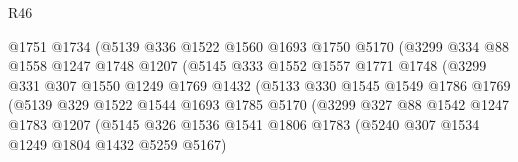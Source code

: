 \begin{lexlean}{R46}
\begin{coremodule}
                                @1751
                                @1734
                                (@5139
                                  @336
                                  @1522
                                  @1560
                                  @1693
                                  @1750
                                  @5170
                                  (@3299
                                    @334
                                    @88
                                    @1558
                                    @1247
                                    @1748
                                    @1207
                                    (@5145
                                      @333
                                      @1552
                                      @1557
                                      @1771
                                      @1748
                                      (@3299
                                        @331
                                        @307
                                        @1550
                                        @1249
                                        @1769
                                        @1432
                                        (@5133
                                          @330
                                          @1545
                                          @1549
                                          @1786
                                          @1769
                                          (@5139
                                            @329
                                            @1522
                                            @1544
                                            @1693
                                            @1785
                                            @5170
                                            (@3299
                                              @327
                                              @88
                                              @1542
                                              @1247
                                              @1783
                                              @1207
                                              (@5145
                                                @326
                                                @1536
                                                @1541
                                                @1806
                                                @1783
                                                (@5240 @307 @1534 @1249 @1804 @1432 @5259 @5167)

\end{coremodule}
\end{lexlean}
